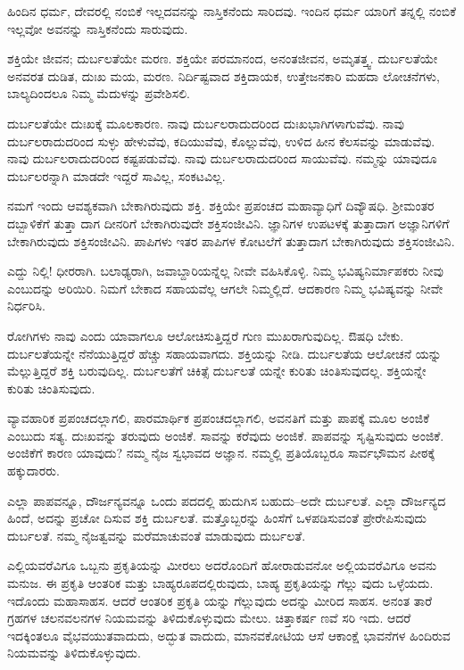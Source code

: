 ಹಿಂದಿನ ಧರ್ಮ, ದೇವರಲ್ಲಿ ನಂಬಿಕೆ ಇಲ್ಲದವನನ್ನು ನಾಸ್ತಿಕನೆಂದು ಸಾರಿದವು. ಇಂದಿನ ಧರ್ಮ ಯಾರಿಗೆ ತನ್ನಲ್ಲಿ ನಂಬಿಕೆ ಇಲ್ಲವೋ ಅವನನ್ನು ನಾಸ್ತಿಕನೆಂದು ಸಾರುವುದು.

ಶಕ್ತಿಯೇ ಜೀವನ; ದುರ್ಬಲತೆಯೇ ಮರಣ. ಶಕ್ತಿಯೇ ಪರಮಾನಂದ, ಅನಂತಜೀವನ, ಅಮೃತತ್ತ್ವ. ದುರ್ಬಲತೆಯೇ ಅನವರತ ದುಡಿತ, ದುಃಖ ಮಯ, ಮರಣ. ನಿರ್ದಿಷ್ಟವಾದ ಶಕ್ತಿದಾಯಕ, ಉತ್ತೇಜನಕಾರಿ ಮಹದಾ ಲೋಚನೆಗಳು, ಬಾಲ್ಯದಿಂದಲೂ ನಿಮ್ಮ ಮೆದುಳನ್ನು ಪ್ರವೇಶಿಸಲಿ.

ದುರ್ಬಲತೆಯೇ ದುಃಖಕ್ಕೆ ಮೂಲಕಾರಣ. ನಾವು ದುರ್ಬಲರಾದುದರಿಂದ ದುಃಖಭಾಗಿಗಳಾಗುವೆವು. ನಾವು ದುರ್ಬಲರಾದುದರಿಂದ ಸುಳ್ಳು ಹೇಳುವೆವು, ಕದಿಯುವೆವು, ಕೊಲ್ಲುವೆವು, ಉಳಿದ ಹೀನ ಕೆಲಸವನ್ನು ಮಾಡುವೆವು. ನಾವು ದುರ್ಬಲರಾದುದರಿಂದ ಕಷ್ಟಪಡುವೆವು. ನಾವು ದುರ್ಬಲರಾದುದರಿಂದ ಸಾಯುವೆವು. ನಮ್ಮನ್ನು ಯಾವುದೂ ದುರ್ಬಲರನ್ನಾಗಿ ಮಾಡದೇ ಇದ್ದರೆ ಸಾವಿಲ್ಲ, ಸಂಕಟವಿಲ್ಲ.

ನಮಗೆ ಇಂದು ಆವಶ್ಯಕವಾಗಿ ಬೇಕಾಗಿರುವುದು ಶಕ್ತಿ. ಶಕ್ತಿಯೇ ಪ್ರಪಂಚದ ಮಹಾವ್ಯಾಧಿಗೆ ದಿವ್ಯೌಷಧಿ. ಶ್ರೀಮಂತರ ದಬ್ಬಾಳಿಕೆಗೆ ತುತ್ತಾ ದಾಗ ದೀನರಿಗೆ ಬೇಕಾಗಿರುವುದೇ ಶಕ್ತಿಸಂಜೀವಿನಿ. ಜ್ಞಾನಿಗಳ ಉಪಟಳಕ್ಕೆ ತುತ್ತಾದಾಗ ಅಜ್ಞಾನಿಗಳಿಗೆ ಬೇಕಾಗಿರುವುದು ಶಕ್ತಿಸಂಜೀವಿನಿ. ಪಾಪಿಗಳು ಇತರ ಪಾಪಿಗಳ ಕೋಟಲೆಗೆ ತುತ್ತಾದಾಗ ಬೇಕಾಗಿರುವುದು ಶಕ್ತಿಸಂಜೀವಿನಿ.

ಎದ್ದು ನಿಲ್ಲಿ! ಧೀರರಾಗಿ. ಬಲಾಢ್ಯರಾಗಿ, ಜವಾಬ್ದಾರಿಯನ್ನೆಲ್ಲ ನೀವೇ ವಹಿಸಿಕೊಳ್ಳಿ. ನಿಮ್ಮ ಭವಿಷ್ಯನಿರ್ಮಾಪಕರು ನೀವು ಎಂಬುದನ್ನು ಅರಿಯಿರಿ. ನಿಮಗೆ ಬೇಕಾದ ಸಹಾಯವೆಲ್ಲ ಆಗಲೇ ನಿಮ್ಮಲ್ಲಿದೆ. ಆದಕಾರಣ ನಿಮ್ಮ ಭವಿಷ್ಯವನ್ನು ನೀವೇ ನಿರ್ಧರಿಸಿ.

ರೋಗಿಗಳು ನಾವು ಎಂದು ಯಾವಾಗಲೂ ಆಲೋಚಿಸುತ್ತಿದ್ದರೆ ಗುಣ ಮುಖರಾಗುವುದಿಲ್ಲ. ಔಷಧಿ ಬೇಕು. ದುರ್ಬಲತೆಯನ್ನೇ ನೆನೆಯುತ್ತಿದ್ದರೆ ಹೆಚ್ಚು ಸಹಾಯವಾಗದು. ಶಕ್ತಿಯನ್ನು ನೀಡಿ. ದುರ್ಬಲತೆಯ ಆಲೋಚನೆ ಯನ್ನು ಮೆಲ್ಲುತ್ತಿದ್ದರೆ ಶಕ್ತಿ ಬರುವುದಿಲ್ಲ. ದುರ್ಬಲತೆಗೆ ಚಿಕಿತ್ಸೆ ದುರ್ಬಲತೆ ಯನ್ನೇ ಕುರಿತು ಚಿಂತಿಸುವುದಲ್ಲ. ಶಕ್ತಿಯನ್ನೇ ಕುರಿತು ಚಿಂತಿಸುವುದು.

ವ್ಯಾವಹಾರಿಕ ಪ್ರಪಂಚದಲ್ಲಾಗಲಿ, ಪಾರಮಾರ್ಥಿಕ ಪ್ರಪಂಚದಲ್ಲಾಗಲಿ, ಅವನತಿಗೆ ಮತ್ತು ಪಾಪಕ್ಕೆ ಮೂಲ ಅಂಜಿಕೆ ಎಂಬುದು ಸತ್ಯ. ದುಃಖವನ್ನು ತರುವುದು ಅಂಜಿಕೆ. ಸಾವನ್ನು ಕರೆವುದು ಅಂಜಿಕೆ. ಪಾಪವನ್ನು ಸೃಷ್ಟಿಸುವುದು ಅಂಜಿಕೆ. ಅಂಜಿಕೆಗೆ ಕಾರಣ ಯಾವುದು? ನಮ್ಮ ನೈಜ ಸ್ವಭಾವದ ಅಜ್ಞಾನ. ನಮ್ಮಲ್ಲಿ ಪ್ರತಿಯೊಬ್ಬರೂ ಸಾರ್ವಭೌಮನ ಪೀಠಕ್ಕೆ ಹಕ್ಕುದಾರರು.

ಎಲ್ಲಾ ಪಾಪವನ್ನೂ, ದೌರ್ಜನ್ಯವನ್ನೂ ಒಂದು ಪದದಲ್ಲಿ ಹುದುಗಿಸ ಬಹುದು–ಅದೇ ದುರ್ಬಲತೆ. ಎಲ್ಲಾ ದೌರ್ಜನ್ಯದ ಹಿಂದೆ, ಅದನ್ನು ಪ್ರಚೋ ದಿಸುವ ಶಕ್ತಿ ದುರ್ಬಲತೆ. ಮತ್ತೊಬ್ಬರನ್ನು ಹಿಂಸೆಗೆ ಒಳಪಡಿಸುವಂತೆ ಪ್ರೇರೇಪಿಸುವುದು ದುರ್ಬಲತೆ. ನಮ್ಮ ನೈಜತ್ವವನ್ನು ಮರೆಮಾಚುವಂತೆ ಮಾಡುವುದು ದುರ್ಬಲತೆ.

ಎಲ್ಲಿಯವರೆವಿಗೂ ಒಬ್ಬನು ಪ್ರಕೃತಿಯನ್ನು ಮೀರಲು ಅದರೊಂದಿಗೆ ಹೋರಾಡುವನೋ ಅಲ್ಲಿಯವರೆವಿಗೂ ಅವನು ಮನುಜ. ಈ ಪ್ರಕೃತಿ ಆಂತರಿಕ ಮತ್ತು ಬಾಹ್ಯರೂಪದಲ್ಲಿರುವುದು, ಬಾಹ್ಯ ಪ್ರಕೃತಿಯನ್ನು ಗೆಲ್ಲು ವುದು ಒಳ್ಳೆಯದು. ಇದೊಂದು ಮಹಾಸಾಹಸ. ಆದರೆ ಆಂತರಿಕ ಪ್ರಕೃತಿ ಯನ್ನು ಗೆಲ್ಲುವುದು ಅದನ್ನು ಮೀರಿದ ಸಾಹಸ. ಅನಂತ ತಾರೆ ಗ್ರಹಗಳ ಚಲನವಲನಗಳ ನಿಯಮವನ್ನು ತಿಳಿದುಕೊಳ್ಳುವುದು ಮೇಲು. ಚಿತ್ತಾಕರ್ಷ ಣವೆ ಸರಿ ಇದು. ಆದರೆ ಇದಕ್ಕಿಂತಲೂ ವೈಭವಯುತವಾದುದು, ಅದ್ಭುತ ವಾದುದು, ಮಾನವಕೋಟಿಯ ಆಸೆ ಆಕಾಂಕ್ಷೆ ಭಾವನೆಗಳ ಹಿಂದಿರುವ ನಿಯಮವನ್ನು ತಿಳಿದುಕೊಳ್ಳುವುದು.

